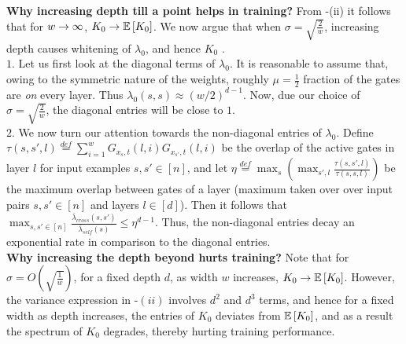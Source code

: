 \textbf{Why increasing depth till a point helps in training? } From -(ii) it follows that for $w\rightarrow\infty$, $K_0\rightarrow\mathbb{E}\left[K_0\right]$. We now argue that when $\sigma=\sqrt{\frac{2}{w}}$, increasing depth causes whitening of $\lambda_0$, and hence $K_0$ .\hfill\\
$1.$ Let us first look at the diagonal terms of $\lambda_0$. It is reasonable to assume that, owing to the symmetric nature of the weights, roughly $\mu=\frac{1}{2}$ fraction of the gates are \emph{on} every layer. Thus $\lambda_0(s,s)\approx (w/2)^{d-1}$. Now, due our choice of $\sigma=\sqrt{\frac{2}{w}}$, the diagonal entries will be close to $1$.\hfill\\
$2.$ We now turn our attention towards the non-diagonal entries of $\lambda_0$. Define $\tau(s,s',l)\stackrel{def}=\sum_{i=1}^w G_{x_s,t}(l,i)G_{x_{s'},t}(l,i)$ be the overlap of the active gates in layer $l$ for input examples $s,s'\in[n]$, and  let $\eta\stackrel{def}=\max_s\left(\max_{s',l} \frac{\tau(s,s',l)}{\tau(s,s,l)}\right)$ be the maximum overlap between gates of a layer (maximum taken over over input pairs $s,s'\in[n]$ and layers $l\in [d]$).  Then it follows that $\max_{s,s'\in [n]} \frac{\bar{\lambda}_{cross}(s,s')}{\bar{\lambda}_{self}(s)}\leq \eta^{d-1}$. Thus, the non-diagonal entries decay an exponential rate in comparison to the diagonal entries.\hfill\\
\textbf{Why increasing the depth beyond hurts training?} Note that for $\sigma=O\left(\sqrt{\frac{1}{w}}\right)$, for a fixed depth $d$, as width $w$ increases, $K_0\rightarrow\mathbb{E}\left[K_0\right]$. However, the variance expression in -$(ii)$ involves $d^2$ and $d^3$ terms, and hence for a fixed width as depth increases, the entries of $K_0$ deviates from $\mathbb{E}\left[K_0\right]$, and as a result the spectrum of $K_0$ degrades, thereby hurting training performance.

